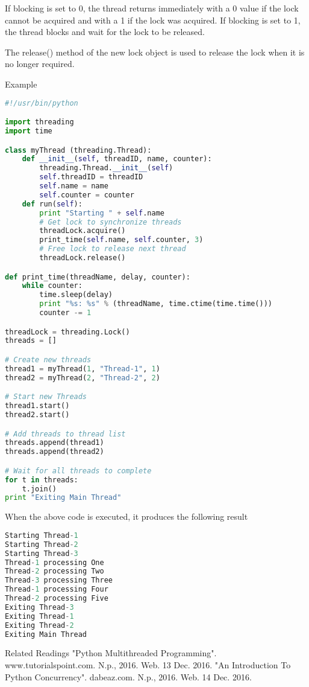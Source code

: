 If blocking is set to 0, the thread returns immediately with a 0 value if the lock cannot be acquired and with a 1 if the lock was acquired. If blocking is set to 1, the thread blocks and wait for the lock to be released.

The release() method of the new lock object is used to release the lock when it is no longer required.

Example

\begin{lstlisting}[language=Python]
#!/usr/bin/python

import threading
import time

class myThread (threading.Thread):
    def __init__(self, threadID, name, counter):
        threading.Thread.__init__(self)
        self.threadID = threadID
        self.name = name
        self.counter = counter
    def run(self):
        print "Starting " + self.name
        # Get lock to synchronize threads
        threadLock.acquire()
        print_time(self.name, self.counter, 3)
        # Free lock to release next thread
        threadLock.release()

def print_time(threadName, delay, counter):
    while counter:
        time.sleep(delay)
        print "%s: %s" % (threadName, time.ctime(time.time()))
        counter -= 1

threadLock = threading.Lock()
threads = []

# Create new threads
thread1 = myThread(1, "Thread-1", 1)
thread2 = myThread(2, "Thread-2", 2)

# Start new Threads
thread1.start()
thread2.start()

# Add threads to thread list
threads.append(thread1)
threads.append(thread2)

# Wait for all threads to complete
for t in threads:
    t.join()
print "Exiting Main Thread"
\end{lstlisting}

When the above code is executed, it produces the following result

\begin{lstlisting}[language=Python]
Starting Thread-1
Starting Thread-2
Starting Thread-3
Thread-1 processing One
Thread-2 processing Two
Thread-3 processing Three
Thread-1 processing Four
Thread-2 processing Five
Exiting Thread-3
Exiting Thread-1
Exiting Thread-2
Exiting Main Thread
\end{lstlisting}

Related Readings
"Python Multithreaded Programming". www.tutorialspoint.com. N.p., 2016. Web. 13 Dec. 2016.
"An Introduction To Python Concurrency". dabeaz.com. N.p., 2016. Web. 14 Dec. 2016.

